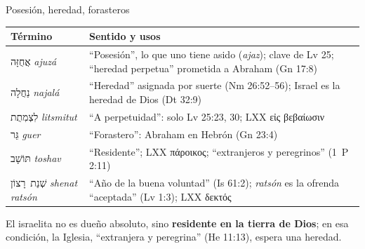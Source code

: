 \documentclass[hyperref={bookmarks=false},aspectratio=169]{beamer}
\newcommand{\heb}[1]{\mbox{\foreignlanguage{hebrew}{#1}}}
\newcommand{\grc}[1]{\foreignlanguage{ancientgreek}{#1}}
\newcommand{\destacar}[1]{\textbf{\textcolor{tierraroja}{#1}}}
\begin{document}
\begin{frame}{Posesión, heredad, forasteros}
\scriptsize\renewcommand{\arraystretch}{1.15}
\begin{tabular}{@{}L{2.7cm}L{9.2cm}@{}}
\toprule
\textbf{Término} & \textbf{Sentido y usos} \\ \midrule
\heb{אֲחֻזָּה} \emph{ajuzá} & ``Posesión'', lo que uno tiene asido (\emph{ajaz}); clave de Lv 25; ``heredad perpetua'' prometida a Abraham (Gn 17:8) \\
\heb{נַחֲלָה} \emph{najalá} & ``Heredad'' asignada por suerte (Nm 26:52--56); Israel es la heredad de Dios (Dt 32:9) \\
\heb{לִצְמִתֻת} \emph{litsmitut} & ``A perpetuidad'': solo Lv 25:23, 30; LXX \grc{εἰς βεβαίωσιν} \\
\heb{גֵּר} \emph{guer} & ``Forastero'': Abraham en Hebrón (Gn 23:4) \\
\heb{תּוֹשָׁב} \emph{toshav} & ``Residente''; LXX \grc{πάροικος}; ``extranjeros y peregrinos'' (1~P 2:11) \\
\heb{שְׁנַת רָצוֹן} \emph{shenat ratsón} & ``Año de la buena voluntad'' (Is 61:2); \emph{ratsón} es la ofrenda ``aceptada'' (Lv 1:3); LXX \grc{δεκτός} \\
\bottomrule
\end{tabular}\par\medskip
\small El israelita no es dueño absoluto, sino \destacar{residente en la tierra de Dios}; en esa condición, la Iglesia, ``extranjera y peregrina'' (He 11:13), espera una heredad.
\end{frame}
\end{document}
